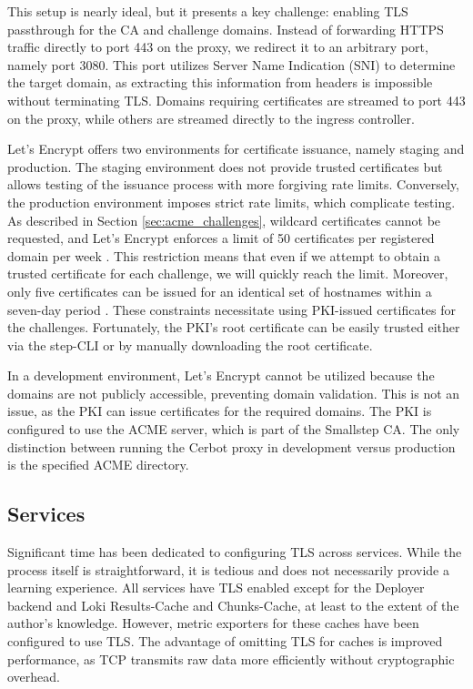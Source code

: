 This setup is nearly ideal, but it presents a key challenge: enabling TLS passthrough for the CA and challenge domains. Instead of forwarding HTTPS traffic directly to port 443 on the proxy, we redirect it to an arbitrary port, namely port 3080. This port utilizes Server Name Indication (SNI) to determine the target domain, as extracting this information from headers is impossible without terminating TLS. Domains requiring certificates are streamed to port 443 on the proxy, while others are streamed directly to the ingress controller.

Let's Encrypt offers two environments for certificate issuance, namely staging and production. The staging environment does not provide trusted certificates but allows testing of the issuance process with more forgiving rate limits. Conversely, the production environment imposes strict rate limits, which complicate testing. As described in Section \ref{sec:acme_challenges}, wildcard certificates cannot be requested, and Let's Encrypt enforces a limit of 50 certificates per registered domain per week \parencite{LetsEncryptRateLimits}. This restriction means that even if we attempt to obtain a trusted certificate for each challenge, we will quickly reach the limit. Moreover, only five certificates can be issued for an identical set of hostnames within a seven-day period \parencite{LetsEncryptRateLimits}. These constraints necessitate using PKI-issued certificates for the challenges. Fortunately, the PKI's root certificate can be easily trusted either via the step-CLI or by manually downloading the root certificate.

In a development environment, Let's Encrypt cannot be utilized because the domains are not publicly accessible, preventing domain validation. This is not an issue, as the PKI can issue certificates for the required domains. The PKI is configured to use the ACME server, which is part of the Smallstep CA. The only distinction between running the Cerbot proxy in development versus production is the specified ACME directory.

\subsection{Services}
Significant time has been dedicated to configuring TLS across services. While the process itself is straightforward, it is tedious and does not necessarily provide a learning experience. All services have TLS enabled except for the Deployer backend and Loki Results-Cache and Chunks-Cache, at least to the extent of the author's knowledge. However, metric exporters for these caches have been configured to use TLS. The advantage of omitting TLS for caches is improved performance, as TCP transmits raw data more efficiently without cryptographic overhead.

